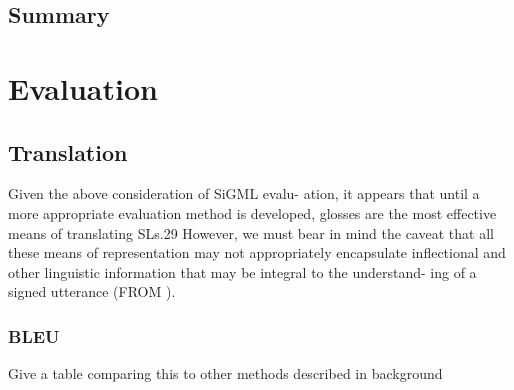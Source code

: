 \documentclass[12pt]{ociamthesis}  %
\begin{document}
\section{Summary}
			


\chapter{Evaluation}

\section{Translation}
 Given the above consideration of SiGML evalu- ation, it appears that until a more appropriate evaluation method is developed, glosses are the most effective means of translating SLs.29 However, we must bear in mind the caveat that all these means of representation may not appropriately encapsulate inflectional and other linguistic information that may be integral to the understand- ing of a signed utterance (FROM ).
	\subsection{BLEU}
	Give a table comparing this to other methods described in background
%	
\end{document}
